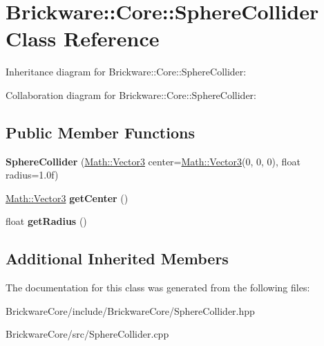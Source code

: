 \hypertarget{classBrickware_1_1Core_1_1SphereCollider}{}\section{Brickware\+:\+:Core\+:\+:Sphere\+Collider Class Reference}
\label{classBrickware_1_1Core_1_1SphereCollider}


Inheritance diagram for Brickware\+:\+:Core\+:\+:Sphere\+Collider\+:


Collaboration diagram for Brickware\+:\+:Core\+:\+:Sphere\+Collider\+:
\subsection*{Public Member Functions}
\begin{DoxyCompactItemize}
\item 
\hypertarget{classBrickware_1_1Core_1_1SphereCollider_a3d276e24d775710cb17ae045e79feccc}{}{\bfseries Sphere\+Collider} (\hyperlink{classBrickware_1_1Math_1_1Vector3}{Math\+::\+Vector3} center=\hyperlink{classBrickware_1_1Math_1_1Vector3}{Math\+::\+Vector3}(0, 0, 0), float radius=1.\+0f)\label{classBrickware_1_1Core_1_1SphereCollider_a3d276e24d775710cb17ae045e79feccc}

\item 
\hypertarget{classBrickware_1_1Core_1_1SphereCollider_a983f0d37ae971ab23d28e2d82b587574}{}\hyperlink{classBrickware_1_1Math_1_1Vector3}{Math\+::\+Vector3} {\bfseries get\+Center} ()\label{classBrickware_1_1Core_1_1SphereCollider_a983f0d37ae971ab23d28e2d82b587574}

\item 
\hypertarget{classBrickware_1_1Core_1_1SphereCollider_af9a9507ea31d7ce40dbf2bf3399a731b}{}float {\bfseries get\+Radius} ()\label{classBrickware_1_1Core_1_1SphereCollider_af9a9507ea31d7ce40dbf2bf3399a731b}

\end{DoxyCompactItemize}
\subsection*{Additional Inherited Members}


The documentation for this class was generated from the following files\+:\begin{DoxyCompactItemize}
\item 
Brickware\+Core/include/\+Brickware\+Core/Sphere\+Collider.\+hpp\item 
Brickware\+Core/src/Sphere\+Collider.\+cpp\end{DoxyCompactItemize}
